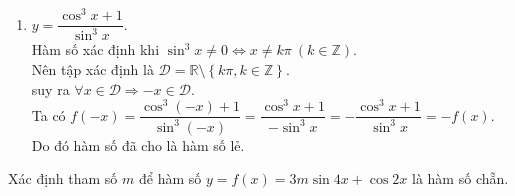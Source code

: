 \begin{ex}
{\begin{enumerate}
	Hàm số xác định khi $\begin{cases} \cos x \ne 0 \\ \sin x \ne 0 \\ \sin^2 x\ne 0
	\end{cases} \Leftrightarrow \begin{cases} x \ne \dfrac{\pi}{2}+k\pi \\ x \ne k\pi\\ x \ne \dfrac{k\pi}{2}
	\end{cases}$$\quad k \in \mathbb{Z}$ $\Leftrightarrow x \ne \dfrac{k\pi}{2}$, $k \in \mathbb{Z}$.\\
	 Tập xác định: $\mathscr{D} = \mathbb{R} \setminus \left\{\dfrac{k\pi}{2}, k \in \mathbb{Z}\right\}$.\\
	 Suy ra $\forall x \in \mathscr{D} \Rightarrow -x \in \mathscr{D}$.\\
	Ta có $f(-x) = \dfrac{\sin(-x) - \tan(-x)}{\sin^2 (-x)} = \dfrac{-\sin x + \tan x}{\sin^2 x} =  -\dfrac{\sin x - \tan x}{\sin^2 x} =- f(x)$.\\
	Do  đó hàm số đã cho là hàm số lẻ.
	\item  $y=\dfrac{\cos^3 x+1}{\sin^3 x}$.\\
	Hàm số xác  định khi $\sin^3 x \ne 0 \Leftrightarrow x \ne k\pi~ (k \in \mathbb{Z})$.\\
	Nên tập xác định là $\mathscr{D} = \mathbb{R} \setminus \left\{k\pi, k \in  \mathbb{Z}\right\}$.\\
	suy ra $\forall x \in  \mathscr{D} \Rightarrow -x \in \mathscr{D}$.\\
	Ta có $f(-x) = \dfrac{\cos^3(-x) + 1}{\sin^3(-x)} = \dfrac{\cos^3 x  + 1}{-\sin^3 x} = -\dfrac{\cos^3 x + 1}{\sin^3 x} = -f(x)$.\\
	Do đó hàm số đã cho là hàm số lẻ. 
	\end{enumerate}
 }
\end{ex}

\begin{ex}%
	Xác định tham số $m$ để hàm số $y=f(x)=3m\sin 4x+\cos 2x$ là  hàm số chẵn.
\end{ex}

